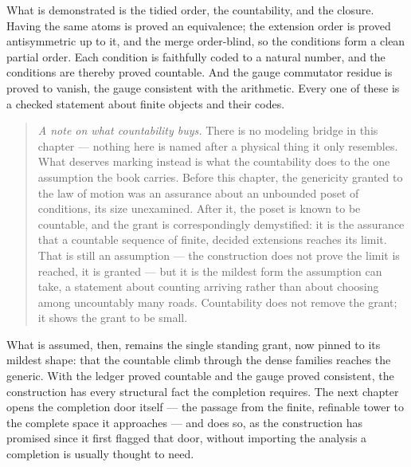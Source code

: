 What is demonstrated is the tidied order, the countability, and the closure. Having the same atoms is
proved an equivalence; the extension order is proved antisymmetric up to it, and the merge order-blind,
so the conditions form a clean partial order. Each condition is faithfully coded to a natural number, and
the conditions are thereby proved countable. And the gauge commutator residue is proved to vanish, the
gauge consistent with the arithmetic. Every one of these is a checked statement about finite objects and
their codes.

\begin{quote}
\emph{A note on what countability buys.} There is no modeling bridge in this chapter --- nothing here is
named after a physical thing it only resembles. What deserves marking instead is what the countability
does to the one assumption the book carries. Before this chapter, the genericity granted to the law of
motion was an assurance about an unbounded poset of conditions, its size unexamined. After it, the poset
is known to be countable, and the grant is correspondingly demystified: it is the assurance that a
countable sequence of finite, decided extensions reaches its limit. That is still an assumption --- the
construction does not prove the limit is reached, it is granted --- but it is the mildest form the
assumption can take, a statement about counting arriving rather than about choosing among uncountably
many roads. Countability does not remove the grant; it shows the grant to be small.
\end{quote}

What is assumed, then, remains the single standing grant, now pinned to its mildest shape: that the
countable climb through the dense families reaches the generic. With the ledger proved countable and the
gauge proved consistent, the construction has every structural fact the completion requires. The next
chapter opens the completion door itself --- the passage from the finite, refinable tower to the complete
space it approaches --- and does so, as the construction has promised since it first flagged that door,
without importing the analysis a completion is usually thought to need.
